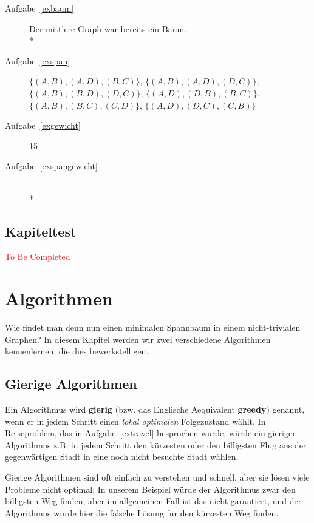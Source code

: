 \documentclass[12pt,a4paper]{report}
\theoremstyle{break}
\theoremstyle{plain}
\begin{document}
\begin{description}
\item[Aufgabe~\ref{exbaum}] Der mittlere Graph war bereits ein Baum.\\*
\item[Aufgabe~\ref{exspan}] $\{(A,B), (A,D), (B,C)\}$, $\{(A,B), (A,D),
  (D,C)\}$, $\{(A,B), (B,D), (D,C)\}$, $\{(A,D), (D,B), (B,C)\}$, $\{(A,B),
  (B,C), (C,D)\}$, $\{(A,D), (D,C), (C,B)\}$
\item[Aufgabe~\ref{exgewicht}] 15
\item[Aufgabe~\ref{exspangewicht}]\hfill\\*

\end{description}

\section{Kapiteltest}
\textcolor{red}{To Be Completed}

\chapter{Algorithmen}

Wie findet man denn nun einen minimalen Spannbaum in einem
nicht-trivialen Graphen? In diesem Kapitel werden wir zwei
verschiedene Algorithmen kennenlernen, die dies bewerkstelligen.

\section{Gierige Algorithmen}

Ein Algorithmus wird \textbf{gierig} (bzw. das Englische Aequivalent
\textbf{greedy}) genannt, wenn er in jedem Schritt einen \emph{lokal
  optimalen} Folgezustand w\"{a}hlt. In Reiseproblem, das in
Aufgabe~\ref{extravel} besprochen wurde, w\"{u}rde ein gieriger
Algorithmus z.B. in jedem Schritt den k\"{u}rzesten oder den
billigsten Flug aus der gegenw\"{a}rtigen Stadt in eine noch nicht
besuchte Stadt w\"{a}hlen.

Gierige Algorithmen sind oft einfach zu verstehen und schnell, aber
sie l\"{o}sen viele Probleme nicht optimal: In unserem Beispiel
w\"{u}rde der Algorithmus zwar den billigsten Weg finden, aber im
allgemeinen Fall ist das nicht garantiert, und der Algorithmus
w\"{u}rde hier die falsche L\"{o}sung f\"{u}r den k\"{u}rzesten Weg
finden.
\end{document}
